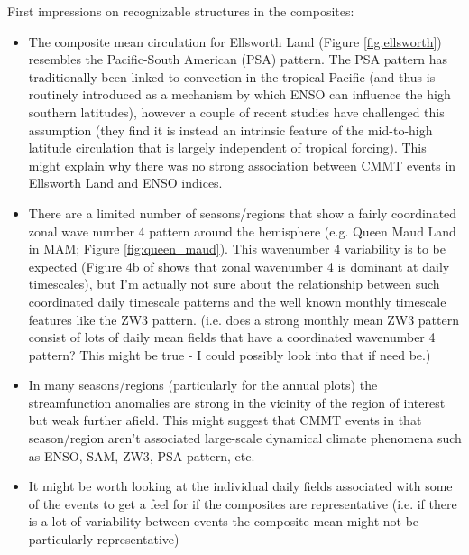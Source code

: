 First impressions on recognizable structures in the composites: 
\begin{itemize}
\item The composite mean circulation for Ellsworth Land (Figure \ref{fig:ellsworth}) resembles the Pacific-South American (PSA) pattern. The PSA pattern has traditionally been linked to convection in the tropical Pacific (and thus is routinely introduced as a mechanism by which ENSO can influence the high southern latitudes), however a couple of recent studies \citep{Irving2016,OKane2017} have challenged this assumption (they find it is instead an intrinsic feature of the mid-to-high latitude circulation that is largely independent of tropical forcing). This might explain why there was no strong association between CMMT events in Ellsworth Land and ENSO indices.
\item There are a limited number of seasons/regions that show a fairly coordinated zonal wave number 4 pattern around the hemisphere (e.g. Queen Maud Land in MAM; Figure \ref{fig:queen_maud}). This wavenumber 4 variability is to be expected (Figure 4b of \citep{Irving2015} shows that zonal wavenumber 4 is dominant at daily timescales), but I'm actually not sure about the relationship between such coordinated daily timescale patterns and the well known monthly timescale features like the ZW3 pattern. (i.e. does a strong monthly mean ZW3 pattern consist of lots of daily mean fields that have a coordinated wavenumber 4 pattern? This might be true - I could possibly look into that if need be.)
\item In many seasons/regions (particularly for the annual plots) the streamfunction anomalies are strong in the vicinity of the region of interest but weak further afield. This might suggest that CMMT events in that season/region aren't associated large-scale dynamical climate phenomena such as ENSO, SAM, ZW3, PSA pattern, etc.  
\item It might be worth looking at the individual daily fields associated with some of the events to get a feel for if the composites are representative (i.e. if there is a lot of variability between events the composite mean might not be particularly representative)
\end{itemize}
